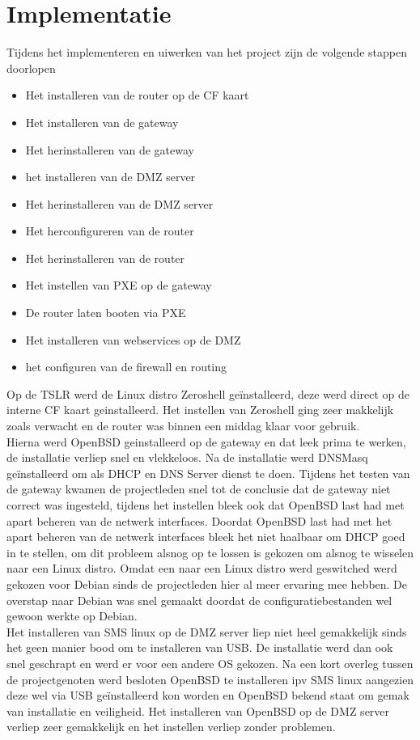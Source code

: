 \documentclass[12pt]{article}
\begin{document}
\section{Implementatie}
Tijdens het implementeren en uiwerken van het project zijn de volgende stappen doorlopen
\begin{itemize}
\item Het installeren van de router op de CF kaart
\item Het installeren van de gateway
\item Het herinstalleren van de gateway
\item het installeren van de DMZ server
\item Het herinstalleren van de DMZ server
\item Het herconfigureren van de router
\item Het herinstalleren van de router
\item Het instellen van PXE op de gateway
\item De router laten booten via PXE
\item Het installeren van webservices op de DMZ
\item het configuren van de firewall en routing
\end{itemize}
Op de TSLR werd de Linux distro Zeroshell ge\"installeerd, deze werd direct op de interne CF kaart geinstalleerd. Het instellen van Zeroshell ging zeer makkelijk zoals verwacht en de router was binnen een middag klaar voor gebruik.
\\Hierna werd OpenBSD geinstalleerd op de gateway en dat leek prima te werken, de installatie verliep snel en vlekkeloos. Na de installatie werd DNSMasq ge\"installeerd om als DHCP en DNS Server dienst te doen. 
Tijdens het testen van de gateway kwamen de projectleden snel tot de conclusie dat de gateway niet correct was ingesteld, tijdens het instellen bleek ook dat OpenBSD last had met apart beheren van de netwerk interfaces. Doordat OpenBSD last had met het apart beheren van de netwerk interfaces bleek het niet haalbaar om DHCP goed in te stellen, om dit probleem alsnog op te lossen is gekozen om alsnog te wisselen naar een Linux distro. Omdat een naar een Linux distro werd geswitched werd gekozen voor Debian sinds de projectleden hier al meer ervaring mee hebben. De overstap naar Debian was snel gemaakt doordat de configuratiebestanden wel gewoon werkte op Debian.
\\Het installeren van SMS linux op de DMZ server liep niet heel gemakkelijk sinds het geen manier bood om te installeren van USB. De installatie werd dan ook snel geschrapt en werd er voor een andere OS gekozen. Na een kort overleg tussen de projectgenoten werd besloten OpenBSD te installeren ipv SMS linux aangezien deze wel via USB ge\"installeerd kon worden en OpenBSD bekend staat om gemak van installatie en veiligheid. Het installeren van OpenBSD op de DMZ server verliep zeer gemakkelijk en het instellen verliep zonder problemen.
\end{document}

